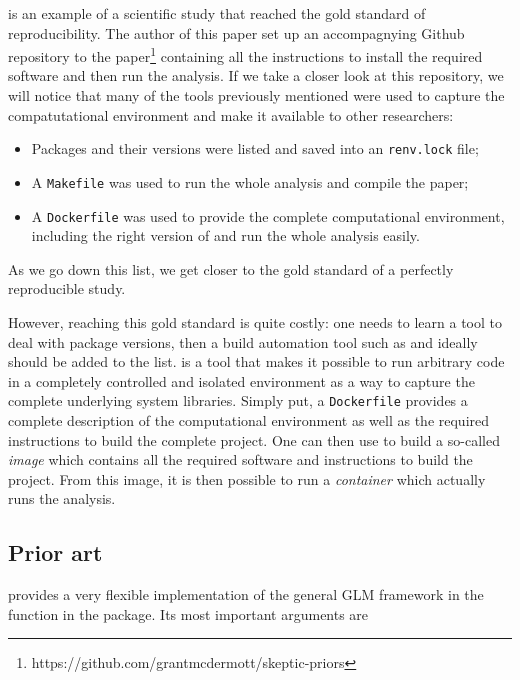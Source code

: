 \documentclass[
  article]{jss}
\providecommand{\tightlist}{%
  \setlength{\itemsep}{0pt}\setlength{\parskip}{0pt}}\usepackage{longtable,booktabs,array}
\newcommand{\fct}[1]{\code{#1()}}
\begin{document}
\citet{mcdermott2021} is an example of a scientific study that reached
the gold standard of reproducibility. The author of this paper set up an
accompagnying Github repository to the paper\footnote{https://github.com/grantmcdermott/skeptic-priors}
containing all the instructions to install the required software and
then run the analysis. If we take a closer look at this repository, we
will notice that many of the tools previously mentioned were used to
capture the compatutational environment and make it available to other
researchers:

\begin{itemize}
\tightlist
\item
  Packages and their versions were listed and saved into an
  \texttt{renv.lock} file;
\item
  A \texttt{Makefile} was used to run the whole analysis and compile the
  paper;
\item
  A \texttt{Dockerfile} was used to provide the complete computational
  environment, including the right version of  and run the
  whole analysis easily.
\end{itemize}

As we go down this list, we get closer to the gold standard of a
perfectly reproducible study.

However, reaching this gold standard is quite costly: one needs to learn
a tool to deal with package versions, then a build automation tool such
as  and ideally  should be added to the
list.  is a tool that makes it possible to run
arbitrary code in a completely controlled and isolated environment as a
way to capture the complete underlying system libraries. Simply put, a
\texttt{Dockerfile} provides a complete description of the computational
environment as well as the required instructions to build the complete
project. One can then use  to build a so-called
\emph{image} which contains all the required software and instructions
to build the project. From this image, it is then possible to run a
\emph{container} which actually runs the analysis.

\subsection{Prior art}\label{subsec-prior}

 provides a very flexible implementation of the general GLM
framework in the function \fct{glm} \citet{ChambersHastie1992} in the
 package. Its most important arguments are
\end{document}
